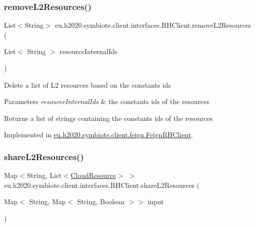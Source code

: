 \subsubsection{\texorpdfstring{remove\+L2\+Resources()}{removeL2Resources()}}
{\footnotesize\ttfamily List$<$String$>$ eu.\+h2020.\+symbiote.\+client.\+interfaces.\+R\+H\+Client.\+remove\+L2\+Resources (\begin{DoxyParamCaption}\item[{List$<$ String $>$}]{resource\+Internal\+Ids }\end{DoxyParamCaption})}

Delete a list of L2 resources based on the constants ids


\begin{DoxyParams}{Parameters}
{\em resource\+Internal\+Ids} & the constants ids of the resources \\
\hline
\end{DoxyParams}
\begin{DoxyReturn}{Returns}
a list of strings containing the constants ids of the resources 
\end{DoxyReturn}


Implemented in \hyperlink{classeu_1_1h2020_1_1symbiote_1_1client_1_1feign_1_1FeignRHClient_a2a7432c5df835ea79f3b5f1f4aec99bf}{eu.\+h2020.\+symbiote.\+client.\+feign.\+Feign\+R\+H\+Client}.

\mbox{\label{interfaceeu_1_1h2020_1_1symbiote_1_1client_1_1interfaces_1_1RHClient_ab033d6b4967030ca4d63f8186b147a88}} 
\subsubsection{\texorpdfstring{share\+L2\+Resources()}{shareL2Resources()}}
{\footnotesize\ttfamily Map$<$String, List$<$\hyperlink{classeu_1_1h2020_1_1symbiote_1_1cloud_1_1model_1_1internal_1_1CloudResource}{Cloud\+Resource}$>$ $>$ eu.\+h2020.\+symbiote.\+client.\+interfaces.\+R\+H\+Client.\+share\+L2\+Resources (\begin{DoxyParamCaption}\item[{Map$<$ String, Map$<$ String, Boolean $>$$>$}]{input }\end{DoxyParamCaption})}

